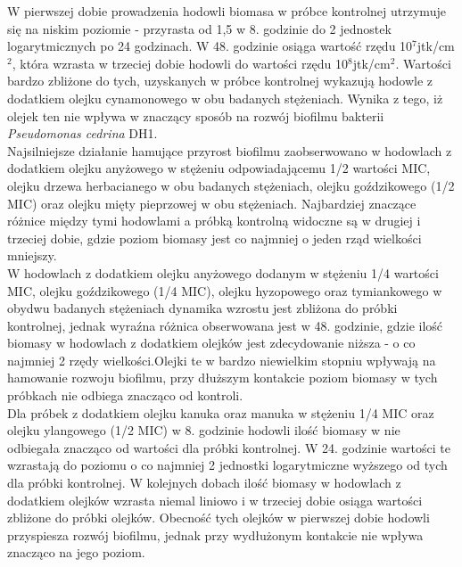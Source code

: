 \documentclass[11pt,a4paper]{report}
\begin{document}
W pierwszej dobie prowadzenia hodowli biomasa w próbce kontrolnej utrzymuje się na niskim poziomie - przyrasta od 1,5 w 8. godzinie do 2 jednostek logarytmicznych po 24 godzinach. W 48. godzinie osiąga wartość rzędu 10$^7$jtk/cm$^2$, która wzrasta w trzeciej dobie hodowli do wartości rzędu 10$^8$jtk/cm$^2$. Wartości bardzo zbliżone do tych, uzyskanych w próbce kontrolnej wykazują hodowle z dodatkiem olejku cynamonowego w obu badanych stężeniach. Wynika z tego, iż olejek ten nie wpływa w znaczący sposób na rozwój biofilmu bakterii \textit{Pseudomonas cedrina} DH1.\\
Najsilniejsze działanie hamujące przyrost biofilmu zaobserwowano w hodowlach z dodatkiem olejku anyżowego w stężeniu odpowiadającemu 1/2 wartości MIC, olejku drzewa herbacianego w obu badanych stężeniach, olejku goździkowego (1/2 MIC) oraz olejku mięty pieprzowej w obu stężeniach. Najbardziej znaczące różnice między tymi hodowlami a próbką kontrolną widoczne są w drugiej i trzeciej dobie, gdzie poziom biomasy jest co najmniej o jeden rząd wielkości mniejszy.\\
W hodowlach z dodatkiem olejku anyżowego dodanym w stężeniu 1/4 wartości MIC, olejku goździkowego (1/4 MIC), olejku hyzopowego oraz tymiankowego w obydwu badanych stężeniach dynamika wzrostu jest zbliżona do próbki kontrolnej, jednak wyraźna różnica obserwowana jest w 48. godzinie, gdzie ilość biomasy w hodowlach z dodatkiem olejków jest zdecydowanie niższa - o co najmniej 2 rzędy wielkości.Olejki te w bardzo niewielkim stopniu wpływają na hamowanie rozwoju biofilmu, przy dłuższym kontakcie poziom biomasy w tych próbkach nie odbiega znacząco od kontroli.\\
Dla próbek z dodatkiem olejku kanuka oraz manuka w stężeniu 1/4 MIC oraz olejku ylangowego (1/2 MIC) w 8. godzinie hodowli ilość biomasy w nie odbiegała znacząco od wartości dla próbki kontrolnej. W 24. godzinie wartości te wzrastają do poziomu o co najmniej 2 jednostki logarytmiczne wyższego od tych dla próbki kontrolnej. W kolejnych dobach ilość biomasy w hodowlach z dodatkiem olejków wzrasta niemal liniowo i w trzeciej dobie osiąga wartości zbliżone do próbki olejków. Obecność tych olejków w pierwszej dobie hodowli przyspiesza rozwój biofilmu, jednak przy wydłużonym kontakcie nie wpływa znacząco na jego poziom.
\end{document}
